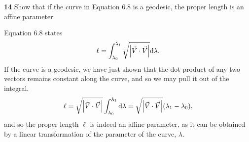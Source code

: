 \documentclass[gr-notes.tex]{subfiles}
\begin{document}
\textbf{14}
Show that if the curve in Equation 6.8 is a geodesic, the proper length is an affine parameter.

Equation 6.8 states
%
\begin{displaymath}
  \ell =
  \int_{\lambda_0}^{\lambda_1} \sqrt{\abs{\vec{V} \cdot \vec{V}}} \dd\lambda.
\end{displaymath}
%
If the curve is a geodesic, we have just shown that the dot product of any two vectors remains constant along the curve, and so we may pull it out of the integral.
%
\begin{displaymath}
  \ell =
  \sqrt{\abs{\vec{V} \cdot \vec{V}}}
  \int_{\lambda_0}^{\lambda_1} \dd\lambda =
  \sqrt{\abs{\vec{V} \cdot \vec{V}}} (\lambda_1 - \lambda_0),
\end{displaymath}
%
and so the proper length $\ell$ is indeed an affine parameter, as it can be obtained by a linear transformation of the parameter of the curve, $\lambda$.
\end{document}
